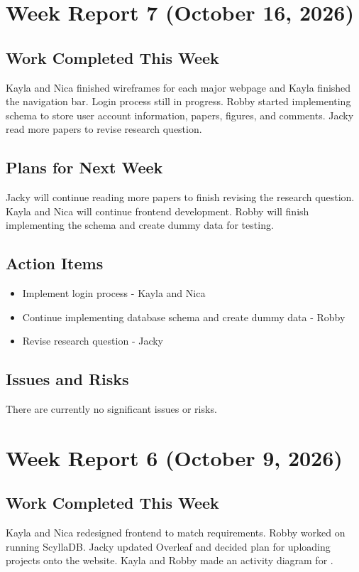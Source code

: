 \section{Week Report 7 (October 16, 2026)}
\subsection{Work Completed This Week}
Kayla and Nica finished wireframes for each major webpage and Kayla finished the navigation bar. Login process still in progress. Robby started implementing schema to store user account information, papers, figures, and comments. Jacky read more papers to revise research question. 

\subsection{Plans for Next Week}
Jacky will continue reading more papers to finish revising the research question. Kayla and Nica will continue frontend development. Robby will finish implementing the schema and create dummy data for testing. 

\subsection{Action Items}
\begin{itemize}
    \item Implement login process - Kayla and Nica
    \item Continue implementing database schema and create dummy data - Robby
    \item Revise research question - Jacky
\end{itemize}

\subsection{Issues and Risks}
There are currently no significant issues or risks.

\section{Week Report 6 (October 9, 2026)}
\subsection{Work Completed This Week}
Kayla and Nica redesigned frontend to match requirements. Robby worked on running ScyllaDB. Jacky updated Overleaf and decided plan for uploading projects onto the website. Kayla and Robby made an activity diagram for . 

